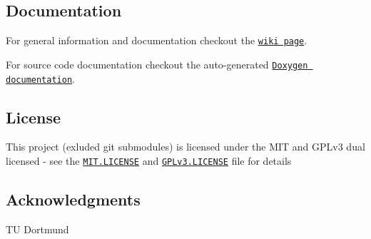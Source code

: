 \subsection*{Documentation}


\begin{DoxyItemize}
\item For general information and documentation checkout the \href{https://github.com/Autonomous-Racing-PG/ros.package/wiki}{\tt wiki page}.
\item For source code documentation checkout the auto-\/generated \href{https://autonomous-racing-pg.github.io/ros.package/html/index.html}{\tt Doxygen documentation}.
\end{DoxyItemize}

\subsection*{License}

This project (exluded git submodules) is licensed under the M\+IT and G\+P\+Lv3 dual licensed -\/ see the \href{MIT.LICENSE}{\tt M\+I\+T.\+L\+I\+C\+E\+N\+SE} and \href{GPLv3.LICENSE}{\tt G\+P\+Lv3.\+L\+I\+C\+E\+N\+SE} file for details

\subsection*{Acknowledgments}


\begin{DoxyItemize}
\item TU Dortmund 
\end{DoxyItemize}